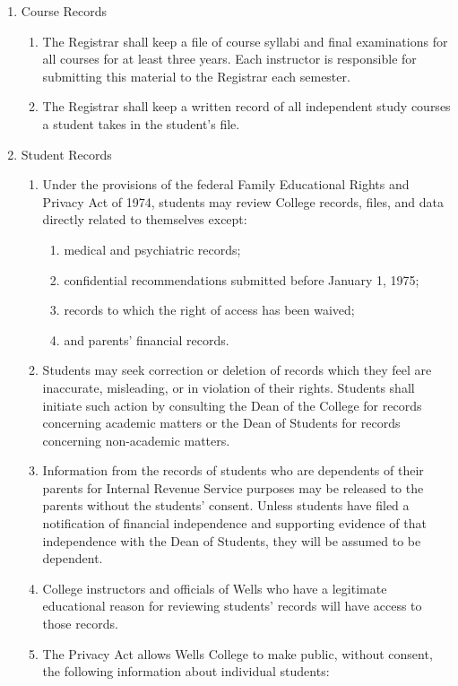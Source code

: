 \documentclass{manual}
\newcommand{\itemLevelA}{\alph*.}
\newcommand{\itemLevelB}{\arabic*)}
\newcommand{\itemRefA}{\alph*}
\newcommand{\itemRefB}{\arabic*}
\begin{document}
				\begin{enumerate}[label=\itemLevelA,ref=\itemRefA]
				\item Course Records

					\begin{enumerate}[label=\itemLevelB,ref=\itemRefB]
					\item The Registrar shall keep a file of course syllabi  and final examinations for all courses for at least three years. Each instructor is responsible for submitting this material to the Registrar each semester.
					\item The Registrar  shall keep a written record of all independent study courses a student takes in the student's file.
					\end{enumerate}
				
				\item Student Records

					\begin{enumerate}[label=\itemLevelB,ref=\itemRefB]
					\item Under the provisions of the federal Family Educational Rights and Privacy Act of 1974, students may review College records, files, and data directly related to themselves except: 

						\begin{enumerate}[label=\alph*)]
						\item medical and psychiatric records; 
						\item confidential recommendations submitted before January 1, 1975;
						\item records to which the right of access has been waived; 
						\item and parents' financial records.
						\end{enumerate}
				
					\item Students may seek correction or deletion of records which they feel are inaccurate, misleading, or in violation of their rights. Students shall initiate such action by consulting the Dean of the College for records concerning academic matters or the Dean of Students for records concerning non-academic matters.
					\item Information from the records of students who are dependents of their parents for Internal Revenue Service purposes may be released to the parents without the students' consent. Unless students have filed a notification of financial independence and supporting evidence of that independence with the Dean of Students, they will be assumed to be dependent.
					\item College instructors and officials of Wells who have a legitimate educational reason for reviewing students' records will have access to those records.
					\item The Privacy Act allows Wells College to make public, without consent, the following information about individual students:


\end{enumerate}
\end{enumerate}
\end{document}
